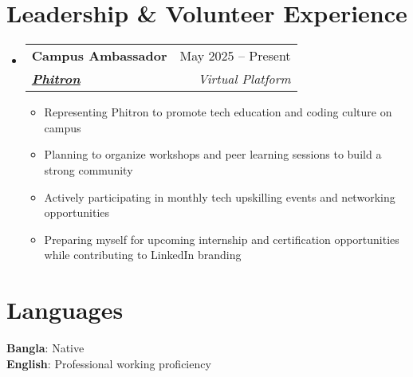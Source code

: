 \documentclass[a4paper,11pt]{article}
\makeatletter
\newcommand{\resumeItem}[1]{
  \item\small{
    {#1 \vspace{-2pt}}
  }
}
\newcommand{\resumeSubheading}[5]{
  \vspace{-2pt}\item
    \begin{tabular*}{0.97\textwidth}[t]{l@{\extracolsep{\fill}}r}
      \textbf{#1} & #2 \\
      \textbf{\textit{\href{#3}{\small #4}}} & \textit{\small #5} \\
    \end{tabular*}\vspace{-7pt}
}
\newcommand{\resumeSubHeadingListStart}{\begin{itemize}[leftmargin=0.15in, label={}]}
\newcommand{\resumeSubHeadingListEnd}{\end{itemize}}
\newcommand{\resumeItemListStart}{\begin{itemize}}
\newcommand{\resumeItemListEnd}{\end{itemize}\vspace{-5pt}}
\makeatother
\begin{document}
\section{\textbf{Leadership \& Volunteer Experience}}
  \resumeSubHeadingListStart
    \resumeSubheading
      {Campus Ambassador}{May 2025 -- Present}
      {https://phitron.io/}{Phitron}{Virtual Platform}
      \resumeItemListStart
        \resumeItem{Representing Phitron to promote tech education and coding culture on campus}
        \resumeItem{Planning to organize workshops and peer learning sessions to build a strong community}
        \resumeItem{Actively participating in monthly tech upskilling events and networking opportunities}
        \resumeItem{Preparing myself for upcoming internship and certification opportunities while contributing to LinkedIn branding}
      \resumeItemListEnd
  \resumeSubHeadingListEnd

\section{\textbf{Languages}}
  \begin{itemize}[leftmargin=0.15in, label={}]
    \small{\item{
      \textbf{Bangla}{: Native} \\
      \textbf{English}{: Professional working proficiency}
    }}
  \end{itemize}

\end{document}
